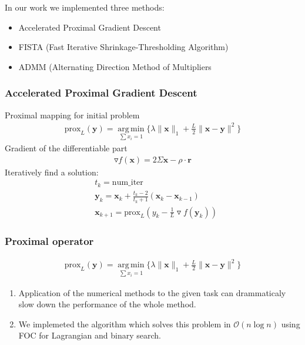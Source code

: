 \documentclass[a4paper]{article}
\DeclareMathOperator*{\argmin}{arg\,min}
\begin{document}
In our work we implemented three methods:
\begin{itemize}
\item Accelerated Proximal Gradient Descent
\item FISTA (Fast Iterative Shrinkage-Thresholding Algorithm)
\item ADMM (Alternating Direction Method of Multipliers
\end{itemize}


\subsubsection*{Accelerated Proximal Gradient Descent}
Proximal mapping for initial problem
\begin{equation*}
\begin{aligned}
\text{prox}_{L}(\mathbf{y}) = \underset{\sum x_i = 1}{\argmin}\{\lambda\|\mathbf{x}\|_1 +\frac{L}{2}\|\mathbf{x} - \mathbf{y}\|^2\}
\end{aligned}
\end{equation*}
Gradient of the differentiable part
\begin{equation*}
\begin{aligned}
\triangledown f(\mathbf{x}) = 2\Sigma \mathbf{x} - \rho\cdot \mathbf{r}
\end{aligned}
\end{equation*}
Iteratively find a solution:
\begin{equation*}
\begin{aligned}
&t_k = \text{num}\_\text{iter}\\
&\mathbf{y}_{k} = \mathbf{x}_k + \frac{t_k-2}{t_k+1}(\mathbf{x}_k - \mathbf{x}_{k-1})\\
&\mathbf{x}_{k+1} = \text{prox}_{L}(y_k - \frac1L \triangledown f(\mathbf{y}_k))
\end{aligned}
\end{equation*}

\subsubsection*{Proximal operator}

\begin{equation*}
\begin{aligned}
\text{prox}_{L}(\mathbf{y}) = \underset{\sum x_i = 1}{\argmin}\{\lambda\|\mathbf{x}\|_1 +\frac{L}{2}\|\mathbf{x} - \mathbf{y}\|^2\}
\end{aligned}
\end{equation*}
\begin{enumerate}
\item Application of the numerical methods to the given task can drammaticaly slow down the performance of the whole method.
\item We implemeted the algorithm which solves this problem in $\mathcal{O} (n \log n)$ using FOC for Lagrangian and binary search.
\end{enumerate}
\end{document}
